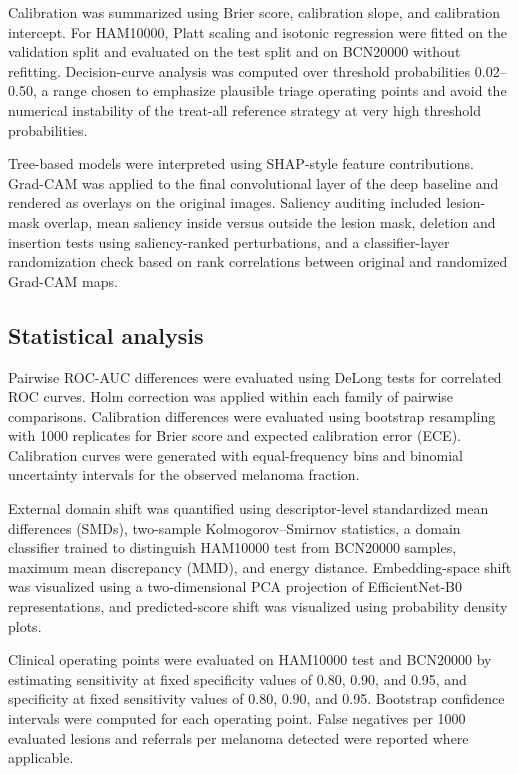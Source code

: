 \documentclass[preprint,12pt]{elsarticle}
\begin{document}
Calibration was summarized using Brier score, calibration slope, and calibration intercept. For HAM10000, Platt scaling and isotonic regression were fitted on the validation split and evaluated on the test split and on BCN20000 without refitting. Decision-curve analysis was computed over threshold probabilities 0.02--0.50, a range chosen to emphasize plausible triage operating points and avoid the numerical instability of the treat-all reference strategy at very high threshold probabilities.

Tree-based models were interpreted using SHAP-style feature contributions. Grad-CAM was applied to the final convolutional layer of the deep baseline and rendered as overlays on the original images. Saliency auditing included lesion-mask overlap, mean saliency inside versus outside the lesion mask, deletion and insertion tests using saliency-ranked perturbations, and a classifier-layer randomization check based on rank correlations between original and randomized Grad-CAM maps.

\subsection{Statistical analysis}

Pairwise ROC-AUC differences were evaluated using DeLong tests for correlated ROC curves. Holm correction was applied within each family of pairwise comparisons. Calibration differences were evaluated using bootstrap resampling with 1000 replicates for Brier score and expected calibration error (ECE). Calibration curves were generated with equal-frequency bins and binomial uncertainty intervals for the observed melanoma fraction.

External domain shift was quantified using descriptor-level standardized mean differences (SMDs), two-sample Kolmogorov--Smirnov statistics, a domain classifier trained to distinguish HAM10000 test from BCN20000 samples, maximum mean discrepancy (MMD), and energy distance. Embedding-space shift was visualized using a two-dimensional PCA projection of EfficientNet-B0 representations, and predicted-score shift was visualized using probability density plots.

Clinical operating points were evaluated on HAM10000 test and BCN20000 by estimating sensitivity at fixed specificity values of 0.80, 0.90, and 0.95, and specificity at fixed sensitivity values of 0.80, 0.90, and 0.95. Bootstrap confidence intervals were computed for each operating point. False negatives per 1000 evaluated lesions and referrals per melanoma detected were reported where applicable.
\end{document}
